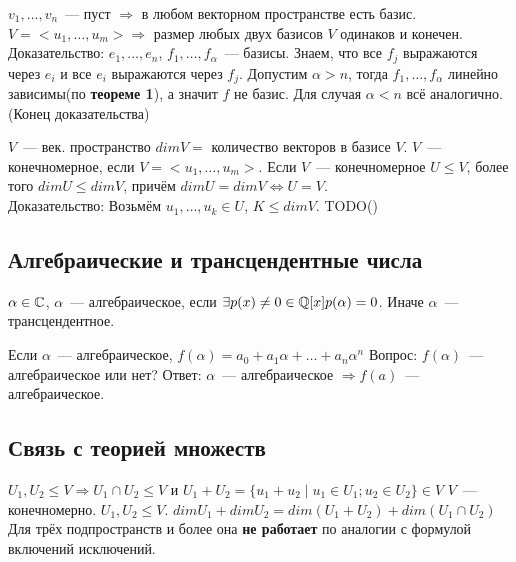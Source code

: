 \cor $v_1,\dots,v_n$~--- пуст $\Rightarrow$ в любом векторном пространстве есть базис.
\thm $V = <u_1,\dots,u_m> \Rightarrow$ размер любых двух базисов $V$ одинаков и конечен.\\
Доказательство:
$e_1,\dots,e_n$, $f_1,\dots,f_\alpha$~--- базисы. Знаем, что все $f_j$
выражаются через $e_i$ и все $e_i$ выражаются через $f_j$.
Допустим $\alpha > n$, тогда $f_1,\dots,f_\alpha$ линейно зависимы(по \textbf{теореме 1}), а значит $f$ не базис.
Для случая $\alpha < n$ всё аналогично.
(Конец доказательства)
\bigskip

 $V$~--- век. пространство $dim V =$ количество 
векторов в базисе $V$.
 $V$~--- конечномерное, если $V = <u_1,\dots, u_m>$.
\rem Если $V$~--- конечномерное $U \leq V$, более того $dim U \leq dim V$, причём $dim U = dim V \Leftrightarrow U=V$.\\
Доказательство:
Возьмём $u_1,\dots,u_k\in U$, $K\leq dim V$. TODO()
\subsection{Алгебраические и трансцендентные числа}
 $\alpha\in\mathbb{C}$, $\alpha$~--- алгебраическое, если $\exists p(x)\not=0\in\mathbb{Q}[x] p(\alpha)=0$.
Иначе $\alpha$~--- трансцендентное.

Если $\alpha$~--- алгебраическое, $f(\alpha) = a_0 + a_1\alpha + \dots + a_n\alpha^n$
Вопрос: $f(\alpha)$~--- алгебраическое или нет?
Ответ:
$\alpha$~--- алгебраическое $\Rightarrow f(a)$~--- алгебраическое.  \subsection{Связь с теорией множеств}
 $U_1, U_2\leq V \Rightarrow U_1\cap U_2 \leq V$ и $U_1+U_2 =
\{u_1+u_2\mid u_1\in U_1; u_2\in U_2\}\in V$
 $V$~--- конечномерно. $U_1, U_2\leq V$. 
$dim U_1 + dim U_2 = dim(U_1+U_2) + dim(U_1\cap U_2)$
\rem Для трёх подпространств и более она \textbf{не работает} по аналогии с формулой включений исключений.
